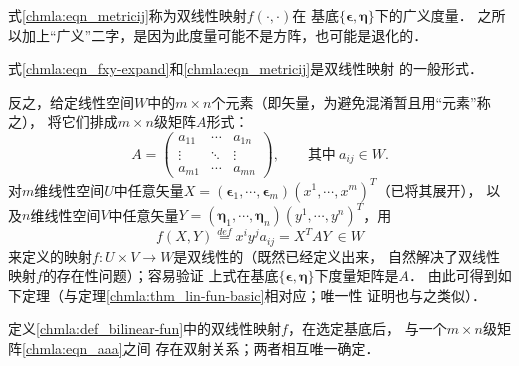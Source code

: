 式\eqref{chmla:eqn_metricij}称为双线性映射$f(\cdot,\cdot)$在
基底$\{\boldsymbol{\epsilon},\boldsymbol{\eta}\}$下的{\heiti 广义度量}．
之所以加上“广义”二字，是因为此度量可能不是方阵，也可能是退化的．


式\eqref{chmla:eqn_fxy-expand}和\eqref{chmla:eqn_metricij}是双线性映射
的一般形式．

反之，给定线性空间$W$中的$m\times n$个元素（即矢量，为避免混淆暂且用“元素”称之），
将它们排成$m\times n$级矩阵$A$形式：
\begin{equation}
    A = \begin{pmatrix}\label{chmla:eqn_aaa}
        a_{11} & \cdots & a_{1n} \\
        \vdots & \ddots & \vdots \\
        a_{m1} & \cdots & a_{mn}
    \end{pmatrix},
    \qquad \text{其中}\ a_{ij}\in W .
\end{equation}
对$m$维线性空间$U$中任意矢量$X=(\boldsymbol{\epsilon}_1, \cdots,
\boldsymbol{\epsilon}_m) (x^1,\cdots,x^m)^T$（已将其展开），
以及$n$维线性空间$V$中任意矢量$Y=(\boldsymbol{\eta}_1, \cdots,
\boldsymbol{\eta}_n) (y^1,\cdots,y^n)^T$，用
\begin{equation}\label{chmla:eqn_bi-fun-form}
    f(X,Y) \overset{def}{=} x^i y^j a_{ij} = X^T A Y \ \in W
\end{equation}
来定义的映射$f:U \times V \to W $是双线性的（既然已经定义出来，
自然解决了双线性映射$f$的存在性问题）；容易验证
上式在基底$\{\boldsymbol{\epsilon},\boldsymbol{\eta}\}$下度量矩阵是$A$．
由此可得到如下定理（与定理\ref{chmla:thm_lin-fun-basic}相对应；唯一性
证明也与之类似）．

\begin{theorem}\label{chmla:thm_bifunmatrix}
定义\ref{chmla:def_bilinear-fun}中的双线性映射$f$，在选定基底后，
与一个$m\times n$级矩阵\eqref{chmla:eqn_aaa}之间
存在双射关系；两者相互唯一确定．
\end{theorem}

